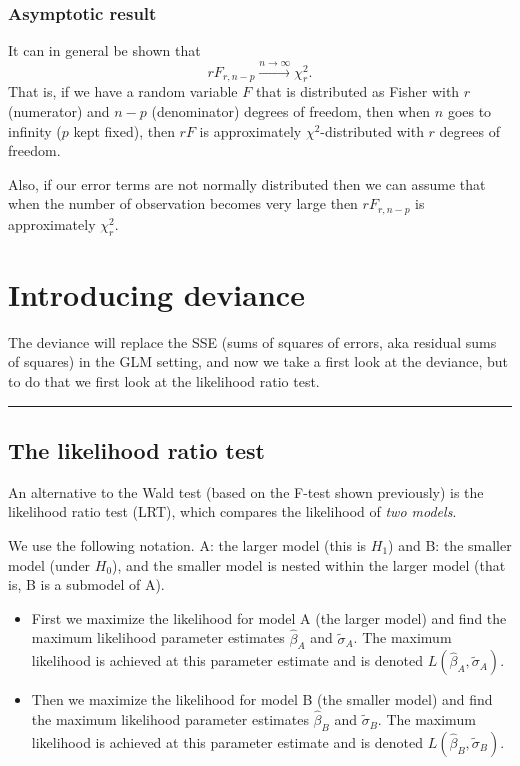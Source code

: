 \documentclass[
]{article}
\providecommand{\tightlist}{%
  \setlength{\itemsep}{0pt}\setlength{\parskip}{0pt}}
\begin{document}
\hypertarget{asymptotic-result}{%
\subsubsection{Asymptotic result}\label{asymptotic-result}}

It can in general be shown that
\[r F_{r,n-p}\stackrel{n\rightarrow \infty}{\longrightarrow} \chi^2_r.\]
That is, if we have a random variable \(F\) that is distributed as
Fisher with \(r\) (numerator) and \(n-p\) (denominator) degrees of
freedom, then when \(n\) goes to infinity (\(p\) kept fixed), then
\(rF\) is approximately \(\chi^2\)-distributed with \(r\) degrees of
freedom.

Also, if our error terms are not normally distributed then we can assume
that when the number of observation becomes very large then
\(rF_{r,n-p}\) is approximately \(\chi^2_r\).

\hypertarget{introducing-deviance}{%
\section{Introducing deviance}\label{introducing-deviance}}

The deviance will replace the SSE (sums of squares of errors, aka
residual sums of squares) in the GLM setting, and now we take a first
look at the deviance, but to do that we first look at the likelihood
ratio test.

\begin{center}\rule{0.5\linewidth}{0.5pt}\end{center}

\hypertarget{the-likelihood-ratio-test}{%
\subsection{The likelihood ratio test}\label{the-likelihood-ratio-test}}

An alternative to the Wald test (based on the F-test shown previously)
is the likelihood ratio test (LRT), which compares the likelihood of
\emph{two models}.

We use the following notation. A: the larger model (this is \(H_1\)) and
B: the smaller model (under \(H_0\)), and the smaller model is nested
within the larger model (that is, B is a submodel of A).

\begin{itemize}
\tightlist
\item
  First we maximize the likelihood for model A (the larger model) and
  find the maximum likelihood parameter estimates \(\hat{\beta}_A\) and
  \(\tilde{\sigma}_A\). The maximum likelihood is achieved at this
  parameter estimate and is denoted
  \(L(\hat{\beta}_A, \tilde{\sigma}_A)\).
\item
  Then we maximize the likelihood for model B (the smaller model) and
  find the maximum likelihood parameter estimates \(\hat{\beta}_B\) and
  \(\tilde{\sigma}_B\). The maximum likelihood is achieved at this
  parameter estimate and is denoted
  \(L(\hat{\beta}_B,\tilde{\sigma}_B)\).
\end{itemize}
\end{document}
